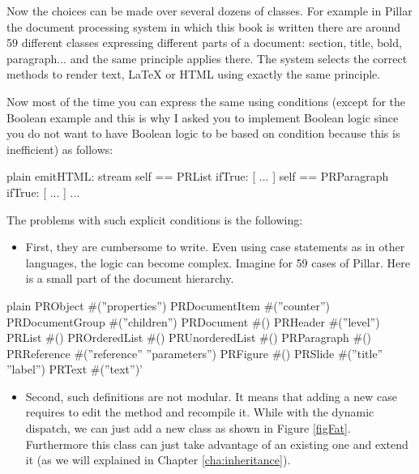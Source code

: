 \documentclass[10pt,twoside,english]{_support/latex/sbabook/sbabook}
\begin{document}
Now the choices can be made over several dozens of classes. For example in Pillar the document processing system in which this book is written there are around 59 different classes expressing different parts of a document: section, title, bold, paragraph... and the same principle applies there. The system selects the correct methods to render text, LaTeX or HTML using exactly the same principle. 

Now most of the time you can express the same using conditions (except for the Boolean example and this is why I asked you to implement Boolean logic since you do not want to have Boolean logic to be based on condition because this is inefficient) as follows:

\begin{displaycode}{plain}
emitHTML: stream
	self == PRList
		ifTrue: [ ... ]
		self == PRParagraph 
			ifTrue: [ ... ]
			...
\end{displaycode}

The problems with such explicit conditions is the following: 

\begin{itemize}
\item First, they are cumbersome to write. Even using case statements as in other languages, the logic can become complex. Imagine for 59 cases of Pillar. Here is a small part of the document hierarchy. 
\end{itemize}

\begin{displaycode}{plain}
PRObject #(''properties'')
        PRDocumentItem #(''counter'')
                PRDocumentGroup #(''children'')
                        PRDocument #()
                        PRHeader #(''level'')
                        PRList #()
                                PROrderedList #()
                                PRUnorderedList #()
                        PRParagraph #()
                        PRReference #(''reference'' ''parameters'')
                                PRFigure #()
                        PRSlide #(''title'' ''label'')
                PRText #(''text'')'
\end{displaycode}

\begin{itemize}
\item Second, such definitions are not modular. It means that adding a new case requires to edit the method and recompile it. While with the dynamic dispatch, we can just add a new class as shown in Figure \ref{figFat}. Furthermore this class can just take advantage of an existing one and extend it (as we will explained in Chapter \ref{cha:inheritance}).
\end{itemize}
\end{document}
